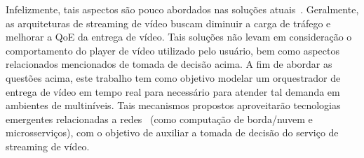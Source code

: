 Infelizmente, tais aspectos são pouco abordados nas soluções atuais~\cite{Mouradian2018ComSurv, bentaeb:2018:MSys}. Geralmente, as arquiteturas de streaming de vídeo buscam diminuir a carga de tráfego e melhorar a QoE da entrega de vídeo. Tais soluções não levam em consideração o comportamento do player de vídeo utilizado pelo usuário, bem como aspectos relacionados mencionados de tomada de decisão acima.
A fim de abordar as questões acima, este trabalho tem como objetivo modelar um orquestrador de entrega de vídeo em tempo real para necessário para atender tal demanda em ambientes de multiníveis. Tais mecanismos propostos aproveitarão tecnologias emergentes relacionadas a redes~ (como computação de borda/nuvem e microsserviços), com o objetivo de auxiliar a tomada de decisão do serviço de streaming de vídeo.
